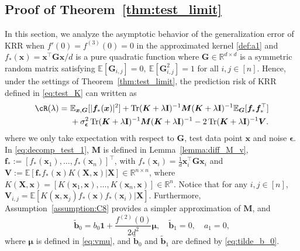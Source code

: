 \documentclass[twoside,11pt]{article}
\newcommand{\bepsilon}{\boldsymbol{\epsilon}}
\newcommand{\R}{\mathbb{R}}
\newcommand{\E}{\mathbb{E}}
\def\bI{{\mathbf I}}
\def\bG{{\boldsymbol G}}
\def\vf{{\boldsymbol f}}
\def\bK{{\boldsymbol K}}
\def\bV{{\boldsymbol V}}
\def\bX{{\boldsymbol X}}
\def\bM{{\boldsymbol M}}
\def\bb{{\boldsymbol b}}
\def\bx{{\boldsymbol x}}
\def\bSigma{{\boldsymbol \Sigma}}
\renewcommand{\bK}{\boldsymbol{K}}
\newcommand{\Tr}{\operatorname{Tr}}
\newcommand{\vmu}{\mbi{\mu}}
\newcommand{\1}{\mathbf{1}}
\def\mbi#1{\boldsymbol{#1}}
\def\mbi#1{\boldsymbol{#1}} %
\begin{document}
\subsection{Proof of Theorem~\ref{thm:test_limit}}\label{sec:proof_test_random}
In this section, we analyze the asymptotic behavior of the generalization error of KRR when $f'(0)=f^{(3)}(0)=0$ in the approximated kernel \eqref{def:a1} and $f_*(\bx)=\bx^\top\bG\bx/d$ is a pure quadratic function where $\bG\in\R^{d\times d} $ is a symmetric random matrix satisfying
$
    \E[\bG_{i,j}]=0,~\E[\bG_{i,j}^2]=1$ for all $i,j\in[n]$.
Hence, under the settings of Theorem~\ref{thm:test_limit}, the prediction risk of KRR  defined in \eqref{eq:test_K} can written as 
\begin{align}
   \cR(\lambda) 
    =~&\E_{\bx,\bG} [|\vf_*(\bx)|^2]+ \Tr(\bK+\lambda\bI)^{-1} \bM (\bK+\lambda\bI)^{-1}\E_{\bG}[\vf_*\vf_*^\top] \\
    ~&+ \sigma^2_{\bepsilon} \Tr(\bK+\lambda\bI)^{-1} \bM (\bK+\lambda\bI)^{-1}   -2\Tr (\bK+\lambda\bI)^{-1}\bV  .\label{eq:decomp_test_1}
\end{align}  
where we only take expectation with respect to $\bG$, test data point $\bx$ and noise $\bepsilon$. In \eqref{eq:decomp_test_1}, $\bM$ is defined in Lemma~\ref{lemma:diff_M_v}, $\vf_*:=[f_*(\bx_1),\ldots,f_*(\bx_n)]^\top$,  with   $f_*(\bx_i)=\frac{1}{d}\bx_i^\top \bG \bx_i$ and
$\bV:= \E[\vf_*f_*(\bx)K(\bX,\bx)|\bX]\in\R^{n\times n}$,
where $K(\bX,\bx)=[K(\bx_1,\bx),\dots, K(\bx_n,\bx)] \in \R^{n}$. Notice that for any $i,j\in[n]$,
        $\bV_{i,j}= \E[K(\bx,\bx_j)f_*(\bx)f_*(\bx_i)|\bX]$.
Furthermore, Assumption~\ref{assumption:C8} provides a simpler approximation of $\bM$, and 
\begin{equation}\label{eq:simple_v(2)}
   \widetilde \bb_0= b_0\1+\frac{f^{(2)}(0)}{2d^2}\vmu,\quad \widetilde\bb_1=0, \quad a_1=0,
\end{equation} 
where $\vmu$ is defined in \eqref{eq:vmu}, and $\widetilde \bb_0$ and $\widetilde\bb_1$ are defined by \eqref{eq:tilde_b_0}.
\end{document}
